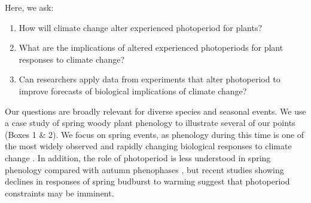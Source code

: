 \documentclass{article}
\begin{document}
\par Here, we ask: 
\begin{enumerate}
\item How will climate change alter experienced photoperiod for plants? 
\item What are the implications of altered experienced photoperiods for plant responses to climate change?
\item Can researchers apply data from experiments that alter photoperiod to improve forecasts of biological implications of climate change?

\end{enumerate}
\par Our questions are broadly relevant for diverse species and seasonal events. We use a case study of spring woody plant phenology to illustrate several of our points (Boxes 1 \& 2). We focus on spring events, as phenology during this time is one of the most widely observed and rapidly changing biological responses to climate change \citep{parmesan2006}. In addition, the role of photoperiod is less understood in spring phenology compared with autumn phenophases \citep[reviewed in, e.g.,][]{azeez2015,gallinat2015,gill2015,lagercrantz2009, allona2008}, but recent studies showing declines in responses of spring budburst to warming \citep[e.g.,][]{fu2019,gusewell2017,yu2010} suggest that photoperiod constraints may be imminent. 
\end{document}
